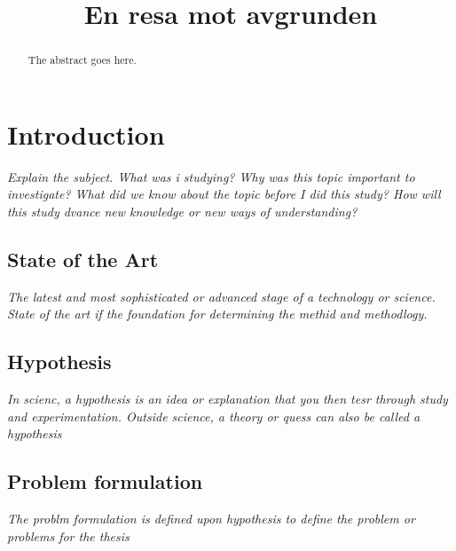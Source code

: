 \documentclass[conference]{IEEEtran}
\begin{document}
\title{En resa mot avgrunden}

\author{
\and
}

\maketitle

\begin{abstract}
The abstract goes here.
\end{abstract}

\IEEEpeerreviewmaketitle{}

\section{Introduction}
\textit{Explain the subject. What was i studying? Why was this topic important to investigate? What did we know about the topic before I did this study? How will this study dvance new knowledge or new ways of understanding?}
\subsection{State of the Art}
\textit{The latest and most sophisticated or advanced stage of a technology or science. State of the art if the foundation for determining the methid and methodlogy.}
\subsection{Hypothesis}
\textit{In scienc, a hypothesis is an idea or explanation that you then tesr through study and experimentation. Outside science, a theory or quess can also be called a hypothesis}
\subsection{Problem formulation}
\textit{The problm formulation is defined upon hypothesis to define the problem or problems for the thesis}
\end{document}
